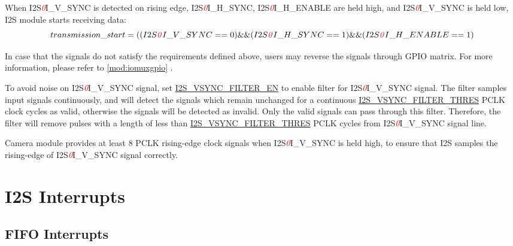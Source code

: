 \documentclass[main\_\_EN.tex]{subfiles}
\begin{document}
When I2S\textcolor{red}{\it{0}}I\_V\_SYNC is detected on rising edge, I2S\textcolor{red}{\it{0}}I\_H\_SYNC, I2S\textcolor{red}{\it{0}}I\_H\_ENABLE are held high, and I2S\textcolor{red}{\it{0}}I\_V\_SYNC is held low, I2S module starts receiving data:
$$transmission\_start= (  (  I2S\textcolor{red}{\it{0}}I\_V\_SYNC==0 ) \&\& (I2S\textcolor{red}{\it{0}}I\_H\_SYNC==1) \&\& ( I2S\textcolor{red}{\it{0}}I\_H\_ENABLE==1 ) $$ \label{start-signal}

In case that the signals do not satisfy the requirements defined above, users may reverse the signals through GPIO matrix. For more information, please refer to \ref{mod:iomuxgpio} \textit{}.

To avoid noise on I2S\textcolor{red}{\it{0}}I\_V\_SYNC signal, set \hyperref[fielddesc:I2SVSYNCFILTEREN]{I2S\_VSYNC\_FILTER\_EN} to enable filter for I2S\textcolor{red}{\it{0}}I\_V\_SYNC signal. The filter samples input signals continuously, and will detect the signals which remain unchanged for a continuous \hyperref[fielddesc:I2SVSYNCFILTERTHRES]{I2S\_VSYNC\_FILTER\_THRES} PCLK clock cycles as valid, otherwise the signals will be detected as invalid. Only the valid signals can pass through this filter. Therefore, the filter will remove pulses with a length of less than \hyperref[fielddesc:I2SVSYNCFILTERTHRES]{I2S\_VSYNC\_FILTER\_THRES} PCLK cycles from I2S\textcolor{red}{\it{0}}I\_V\_SYNC signal line.

Camera module provides at least 8 PCLK rising-edge clock signals when I2S\textcolor{red}{\it{0}}I\_V\_SYNC is held high, to ensure that I2S samples the rising-edge of I2S\textcolor{red}{\it{0}}I\_V\_SYNC signal correctly.

\section{I2S Interrupts} \label{I2S_INT}
\subsection{FIFO Interrupts}
\end{document}
